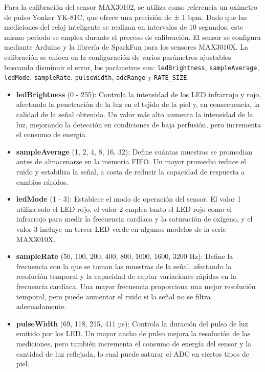 \documentclass[
  12pt,
  letterpaper,
  DIV=11,
  numbers=noendperiod]{scrreport}
\providecommand{\tightlist}{%
  \setlength{\itemsep}{0pt}\setlength{\parskip}{0pt}}\usepackage{longtable,booktabs,array}
\begin{document}
Para la calibración del sensor MAX30102, se utiliza como referencia un
oxímetro de pulso Yonker YK-81C, que ofrece una precisión de ± 1 bpm.
Dado que las mediciones del reloj inteligente se realizan en intervalos
de 10 segundos, este mismo periodo se emplea durante el proceso de
calibración. El sensor se configura mediante Arduino y la librería de
SparkFun para los sensores MAX3010X. La calibración se enfoca en la
configuración de varios parámetros ajustables buscando disminuir el
error, los parámetros son: \texttt{ledBrightness},
\texttt{sampleAverage}, \texttt{ledMode}, \texttt{sampleRate},
\texttt{pulseWidth}, \texttt{adcRange} y \texttt{RATE\_SIZE}.

\begin{itemize}
\tightlist
\item
  \textbf{ledBrightness} (0 - 255): Controla la intensidad de los LED
  infrarrojo y rojo, afectando la penetración de la luz en el tejido de
  la piel y, en consecuencia, la calidad de la señal obtenida. Un valor
  más alto aumenta la intensidad de la luz, mejorando la detección en
  condiciones de baja perfusión, pero incrementa el consumo de energía.
\item
  \textbf{sampleAverage} (1, 2, 4, 8, 16, 32): Define cuántas muestras
  se promedian antes de almacenarse en la memoria FIFO. Un mayor
  promedio reduce el ruido y estabiliza la señal, a costa de reducir la
  capacidad de respuesta a cambios rápidos.
\item
  \textbf{ledMode} (1 - 3): Establece el modo de operación del sensor.
  El valor 1 utiliza solo el LED rojo, el valor 2 emplea tanto el LED
  rojo como el infrarrojo para medir la frecuencia cardíaca y la
  saturación de oxígeno, y el valor 3 incluye un tercer LED verde en
  algunos modelos de la serie MAX3010X.
\item
  \textbf{sampleRate} (50, 100, 200, 400, 800, 1000, 1600, 3200 Hz):
  Define la frecuencia con la que se toman las muestras de la señal,
  afectando la resolución temporal y la capacidad de captar variaciones
  rápidas en la frecuencia cardíaca. Una mayor frecuencia proporciona
  una mejor resolución temporal, pero puede aumentar el ruido si la
  señal no se filtra adecuadamente.
\item
  \textbf{pulseWidth} (69, 118, 215, 411 µs): Controla la duración del
  pulso de luz emitido por los LED. Un mayor ancho de pulso mejora la
  resolución de las mediciones, pero también incrementa el consumo de
  energía del sensor y la cantidad de luz reflejada, lo cual puede
  saturar el ADC en ciertos tipos de piel.

\end{itemize}
\end{document}
